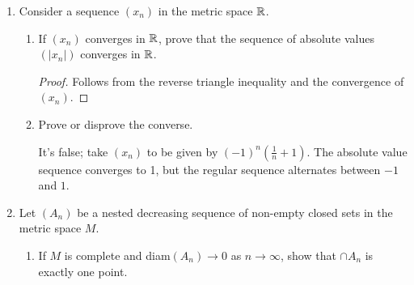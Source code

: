 \documentclass[11pt, a4paper, latinreim, shortsets]{notes}
\begin{document}
\begin{enumerate}[label={\bfseries 2.\arabic*}]
\begin{enumerate}[label=\alph*)]
		\item Do the same for closedness.
			\begin{itemize}
				\item[] \begin{proof}
						Assume $N$ is a closed metric subspace of $M$, and that $U \subset N$. Then if $U$ is closed
						in $N$, all its limits are contained in $U$, which is also contained in $M$, and so it is
						closed in $M$. Conversely, if $U$ is closed in $M$, and is a subset of $N$, then it is also
						closed in $M$, as its limits are still inside of itself. We can also similarly say that if
						closedness is equivalent in $M$ and $N$, then $N$ being closed in itself means $N$ is closed
						in $M$.
					\end{proof}
			\end{itemize}
		\item Deduce that a clopen metric subspace $N$ is the only example in which the concepts of openness
			and closedness in the subspace agree exactly with the concepts in the big space.
			\begin{itemize}
				\item[] Kinda trivial. If closedness and openness are both in agreement, then $N$ must be closed
					and open simultaneously.
			\end{itemize}
	\end{enumerate}

	\item Consider a sequence $(x_n)$ in the metric space $\mathbb{R}$.
	\begin{enumerate}[label=\alph*)]
		\item If $(x_n)$ converges in $\mathbb{R}$, prove that the sequence of absolute values $(|x_n|)$ converges
			in $\mathbb{R}$.
			\begin{proof}
				Follows from the reverse triangle inequality and the convergence of $(x_n)$.
			\end{proof}
		\item Prove or disprove the converse.

			It's false; take $(x_n)$ to be given by $(-1)^n \left( \frac{1}{n} + 1\right)$. The absolute 
			value sequence converges to 1, but the regular sequence alternates between $-1$ and $1$.
	\end{enumerate}

	\item Let $(A_n)$ be a nested decreasing sequence of non-empty closed sets in the metric space
	$M$.
	\begin{enumerate}[label=\alph*)]
		\item If $M$ is complete and diam$(A_n) \to 0$ as $n \to \infty$, show that $\cap A_n$ is exactly
			one point.


\end{enumerate}
\end{enumerate}
\end{document}

